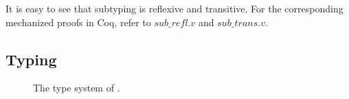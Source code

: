 


It is easy to see that subtyping is reflexive and transitive. For the
corresponding mechanized proofs in Coq, refer to $sub\_refl.v$ and
$sub\_trans.v$.

\subsection{Typing}

\begin{figure*}

\begin{mathpar}



\end{mathpar}
\begin{mathpar}



\end{mathpar}
\begin{mathpar}



\end{mathpar}
\caption{The type system of \name.}
  \label{fig:fi-typing}
\end{figure*}

